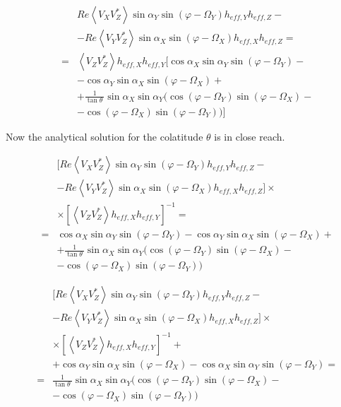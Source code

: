 \documentclass[a4paper,14pt]{extbook}
\begin{document}
\begin{eqnarray}
&&Re \left\langle V_X V_Z^{*}\right\rangle \sin \alpha_Y  \sin (\varphi - \Omega_Y) h_{eff,Y}h_{eff,Z}-\nonumber \\
&&-Re \left\langle V_Y V_Z^{*}\right\rangle\sin \alpha_X  \sin (\varphi - \Omega_X) h_{eff,X}h_{eff,Z}= \nonumber \\
&=&\left\langle V_Z V_Z^{*} \right\rangle h_{eff,X} h_{eff,Y} [\cos \alpha_X  \sin \alpha_Y  \sin (\varphi - \Omega_Y)- \nonumber \\
&&- \cos \alpha_Y \sin \alpha_X  \sin (\varphi - \Omega_X) + \nonumber \\
&&+  \frac{1}{\tan \theta\ } \sin \alpha_X  \sin \alpha_Y ( \cos (\varphi - \Omega_Y)  \sin (\varphi - \Omega_X)- \nonumber \\
&&-\cos (\varphi - \Omega_X)  \sin (\varphi - \Omega_Y)) ]
\end{eqnarray}

Now the analytical solution for the colatitude $\theta$  is in close reach.

\begin{eqnarray}
&&[Re \left\langle V_X V_Z^{*}\right\rangle \sin \alpha_Y  \sin (\varphi - \Omega_Y) h_{eff,Y}h_{eff,Z}-\nonumber \\
&&-Re \left\langle V_Y V_Z^{*}\right\rangle\sin \alpha_X  \sin (\varphi - \Omega_X) h_{eff,X}h_{eff,Z}]\times \nonumber \\
&& \times \left[ \left\langle V_Z V_Z^{*} \right\rangle h_{eff,X} h_{eff,Y} \right]^{-1} =\nonumber \\
&=& \cos \alpha_X  \sin \alpha_Y  \sin (\varphi - \Omega_Y)-  \cos \alpha_Y \sin \alpha_X  \sin (\varphi - \Omega_X) +\nonumber \\
&&+  \frac{1}{\tan \theta\ } \sin \alpha_X  \sin \alpha_Y ( \cos (\varphi - \Omega_Y)  \sin (\varphi - \Omega_X)-\nonumber \\
&&- \cos (\varphi - \Omega_X)  \sin (\varphi - \Omega_Y))
\end{eqnarray}

\begin{eqnarray}
&&[Re \left\langle V_X V_Z^{*}\right\rangle \sin \alpha_Y  \sin (\varphi - \Omega_Y) h_{eff,Y}h_{eff,Z}-\nonumber \\
&&-Re\left\langle V_Y V_Z^{*}\right\rangle\sin \alpha_X  \sin (\varphi - \Omega_X) h_{eff,X}h_{eff,Z}]\times \nonumber \\
&&\times \left[ \left\langle V_Z V_Z^{*} \right\rangle h_{eff,X} h_{eff,Y}\right]^{-1}+\nonumber \\
&&+\cos \alpha_Y \sin \alpha_X  \sin (\varphi - \Omega_X)-\cos \alpha_X  \sin \alpha_Y  \sin (\varphi - \Omega_Y)=\nonumber \\
&=&  \frac{1}{\tan \theta\ } \sin \alpha_X  \sin \alpha_Y ( \cos (\varphi - \Omega_Y)  \sin (\varphi - \Omega_X) - \nonumber \\
&&-\cos (\varphi - \Omega_X)  \sin (\varphi - \Omega_Y))
\end{eqnarray}
\end{document}
